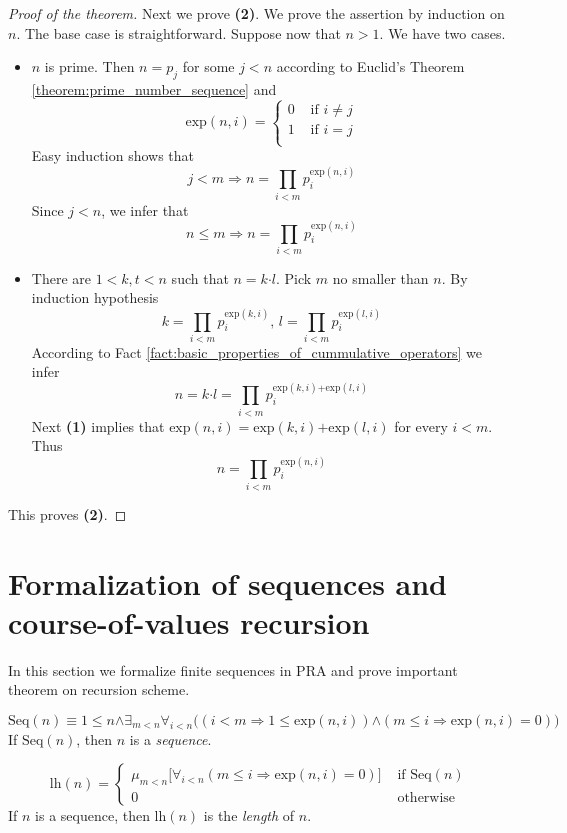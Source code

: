 \documentclass[10pt]{amsart}
\newcommand{\mforall}{\boldsymbol{\forall}}
\newcommand{\mexists}{\boldsymbol{\exists}}
\newcommand{\mra}{\boldsymbol{\Rightarrow}}
\newcommand{\mand}{\boldsymbol{\wedge}}
\newcommand{\mle}{\boldsymbol{<}}
\newcommand{\mge}{\boldsymbol{>}}
\newcommand{\mleq}{\boldsymbol{\leq}}
\newcommand{\meq}{\boldsymbol{=}}
\newcommand{\mneq}{\boldsymbol{\neq}}
\newcommand{\mplus}{\boldsymbol{+}}
\newcommand{\mdot}{\boldsymbol{\cdot}}
\begin{document}
\begin{proof}[Proof of the theorem]
	Next we prove \textbf{(2)}. We prove the assertion by induction on $n$. The base case is straightforward. Suppose now that $n \mge 1$. We have two cases.
	\begin{itemize}
		\item $n$ is prime. Then $n \meq p_j$ for some $j \mle n$ according to Euclid's Theorem \ref{theorem:prime_number_sequence} and
		      $$\mathrm{exp}(n,i) \meq \begin{cases}
				      0 & \mbox{ if }i \mneq j \\
				      1 & \mbox{ if }i \meq j  \\
			      \end{cases}
		      $$
		      Easy induction shows that
		      $$j \mle m \mra n \meq \prod_{i \mle m}p_i^{\mathrm{exp}(n,i)}$$
		      Since $j \mle n$, we infer that
		      $$n \mleq m \mra n \meq \prod_{i \mle m}p_i^{\mathrm{exp}(n,i)}$$
		\item There are $1 \mle k,t \mle n$ such that $n \meq k\mdot l$. Pick $m$ no smaller than $n$. By induction hypothesis
		      $$k \meq \prod_{i \mle m}p_i^{\mathrm{exp}(k,i)},\,l \meq \prod_{i \mle m}p_i^{\mathrm{exp}(l,i)}$$
		      According to Fact \ref{fact:basic_properties_of_cummulative_operators} we infer
		      $$n \meq k\mdot l \meq \prod_{i \mle m}p_i^{\mathrm{exp}(k,i) \mplus \mathrm{exp}(l,i)}$$
		      Next \textbf{(1)} implies that $\mathrm{exp}(n,i) \meq \mathrm{exp}(k,i) \mplus \mathrm{exp}(l,i)$ for every $i \mle m$. Thus
		      $$n \meq \prod_{i \mle m}p_i^{\mathrm{exp}(n,i)}$$
	\end{itemize}
	This proves \textbf{(2)}.
\end{proof}

\section{Formalization of sequences and course-of-values recursion}
\noindent
In this section we formalize finite sequences in $\mathrm{PRA}$ and prove important theorem on recursion scheme.

\begin{definition}
	$$\mathrm{Seq}(n) \equiv 1 \mleq n \mand \mexists_{m \mle n}\mforall_{i \mle n}\big(\left(i \mle m \mra 1 \mleq \mathrm{exp}(n,i)\right) \mand \left(m \mleq i \mra \mathrm{exp}(n,i) \meq 0\right)\big)$$
	If $\mathrm{Seq}(n)$, then $n$ is a \textit{sequence}.
\end{definition}

\begin{definition}
	$$\mathrm{lh}(n) \meq \begin{cases}
			\mu_{m \mle n}\big[\mforall_{i \mle n}\left(m \mleq i \mra \mathrm{exp}(n,i) \meq 0\right)\big] & \mbox{ if }\mathrm{Seq}(n) \\
			0                                                                                               & \mbox{ otherwise }
		\end{cases}
	$$
	If $n$ is a sequence, then $\mathrm{lh}(n)$ is the \textit{length} of $n$.
\end{definition}
\end{document}
